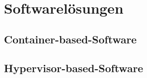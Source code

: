 \thispagestyle{empty}

\section{Softwarelösungen}

\subsection{Container-based-Software}

\subsection{Hypervisor-based-Software}